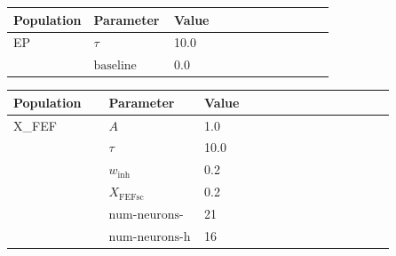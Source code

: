 \documentclass{article}
\begin{document}
\noindent
\begin{tabularx}{\linewidth}{|p{0.25\linewidth}|p{0.25\linewidth}|X|}\hline
\textbf{Population} & \textbf{Parameter} & \textbf{Value}   \\ \hline

    EP             & $\tau$        & 10.0  \\ \hline

                 & ${\text{baseline}}$        & 0.0  \\ \hline

\end{tabularx}

\vspace{2ex}

\noindent
\begin{tabularx}{\linewidth}{|p{0.25\linewidth}|p{0.25\linewidth}|X|}\hline
\textbf{Population} & \textbf{Parameter} & \textbf{Value}   \\ \hline

    X\_FEF             & $A$        & 1.0  \\ \hline

                 & $\tau$        & 10.0  \\ \hline

                 & $w_{\text{inh}}$        & 0.2  \\ \hline

                 & $X_{\text{FEFsc}}$        & 0.2  \\ \hline

                 & ${\text{num-neurons-w}}$        & 21  \\ \hline

                 & ${\text{num-neurons-h}}$        & 16  \\ \hline

\end{tabularx}

\vspace{2ex}
\end{document}
